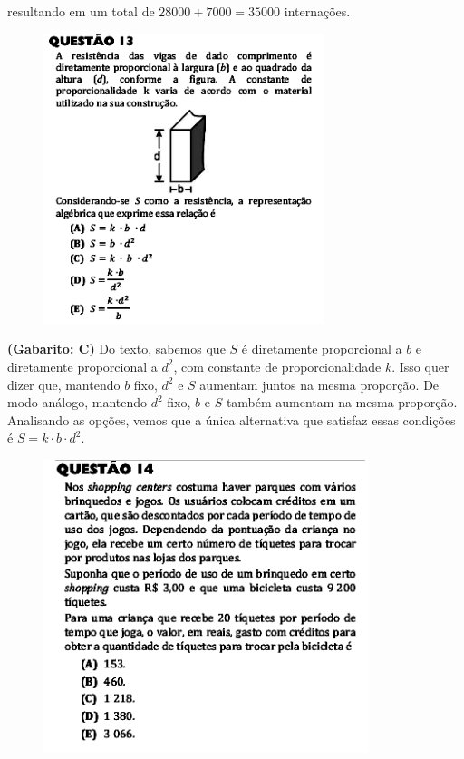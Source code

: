 \documentclass[a4paper]{article}
\begin{document}
\par\vspace{0.3cm} resultando em um total de $28000+7000 = 35000$ internações.
\begin{figure}[H]
	\begin{center}
		\includegraphics[width=8.2cm]{L2Q13.png}
	\end{center}
\end{figure}
\par\textbf{(Gabarito: C)} Do texto, sabemos que $S$ é diretamente proporcional a $b$ e diretamente proporcional a $d^2$, com constante de proporcionalidade $k$. Isso quer dizer que, mantendo $b$ fixo, $d^2$ e $S$ aumentam juntos na mesma proporção. De modo análogo, mantendo $d^2$ fixo, $b$ e $S$ também aumentam na mesma proporção. Analisando as opções, vemos que a única alternativa que satisfaz essas condições é $S = k\cdot b\cdot d^2$.
\begin{figure}[H]
	\begin{center}
		\includegraphics[width=9.5cm]{L2Q14.png}
	\end{center}
\end{figure}  
\end{document}
